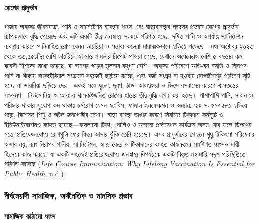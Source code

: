 \paragraph{রোগের
প্রাদুর্ভাব}\label{ux9b0ux997ux9b0-ux9aaux9b0ux9a6ux9b0ux9adux9ac}

গাজায় অবরুদ্ধ জীবনযাত্রা, পানি ও স্যানিটেশন ব্যবস্থার ধ্বংস এবং স্বাস্থ্যব্যবস্থার
পতনের প্রভাবে রোগের প্রাদুর্ভাব ব্যাপকভাবে বৃদ্ধি পেয়েছে এবং এটি একটি তীব্র
জনস্বাস্থ্য সংকটে পরিণত হচ্ছে; দূষিত পানি ও অপর্যাপ্ত স্যানিটেশন ব্যবস্থার কারণে
পানিবাহিত রোগ যেমন ডায়রিয়া ও সম্ভাব্য কলেরা মারাত্মকভাবে ছড়িয়ে পড়েছে---মধ্য
অক্টোবর ২০২৩ থেকে ৩৩,৫৫১টির বেশি ডায়রিয়া আক্রান্ত মামলার রিপোর্ট পাওয়া গেছে,
যেখানে অর্ধেকেরও বেশি ৫ বছরের কম বয়েসী শিশুদের মধ্যে হয়েছে, যা আগের গড়ের
তুলনায় বহুগুণ বেশি। অবরুদ্ধ পরিবেশে অতি-ঘন বসতি ও নিরাপদ পানি না থাকায়
ব্যাকটেরিয়াল সংক্রমণ সহজেই ছড়িয়ে যাচ্ছে, এবং বর্জ্য সংগ্রহ না হওয়ায় রোগজীবাণুর
পরিবেশ সৃষ্টি হচ্ছে যা ডায়রিয়া ছড়িয়ে দেয়। একই সঙ্গে ধুলো, দূষণ, ঠান্ডা আবহাওয়া
ও ভিড়ে বসবাসের কারণে শ্বাসতন্ত্রের সংক্রমণ---নিউমোনিয়া ও অন্যান্য শ্বাসকষ্টজনিত
রোগের হারের তীব্র বৃদ্ধি লক্ষ্য করা হচ্ছে। পাশাপাশি পানি, সাবান ও পরিষ্কার
থাকার সুযোগ কম থাকায় চর্মরোগ যেমন স্ক্যাবিস, ফাঙ্গাল ইনফেকশন ও অন্যান্য ত্বক
সংক্রমণ দ্রুত ছড়িয়ে পড়ে, বিশেষত শিশু ও অটল জনগোষ্ঠীর মধ্যে। স্বাস্থ্য ব্যবস্থা
ভাঙার কারণে নিয়মিত টিকাদান কর্মসূচি ও ইমিউনাইজেশনও ব্যাহত হয়েছে---ফসলানো
টিকা, পোলিও ও অন্যান্য প্রতিষেধক কার্যক্রম অসম, যার ফলে ডিপথের মতো
প্রতিষেধনযোগ্য রোগগুলি ফের ফিরে আসার ঝুঁকি তৈরি হয়েছে। এসব প্রাদুর্ভাবের পেছনে
শুধু চিকিৎসা পরিষেবার অভাব নয়, বরং নিরাপদ পানীয়, স্যানিটেশন, স্বাস্থ্য কেন্দ্র ও
টিকাদানের ব্যাহত কার্যক্রমের সমষ্টিগত ধ্বংসও দায়ী হিসেবে কাজ করছে, যা একটি
সহজেই প্রতিরোধযোগ্য জনস্বাস্থ্য বিপর্যয়কে একটি বিস্তৃত মহামারি-সদৃশ পরিস্থিতিতে
পরিণত করেছে (\emph{Life Course Immunization: Why Lifelong Vaccination Is
Essential for Public Health}, n.d.)।

\subsubsection{দীর্ঘমেয়াদী সামাজিক, অর্থনৈতিক ও মানসিক
প্রভাব}\label{ux9a6ux9b0ux998ux9aeux9dfux9a6-ux9b8ux9aeux99cux995-ux985ux9b0ux9a5ux9a8ux9a4ux995-ux993-ux9aeux9a8ux9b8ux995-ux9aaux9b0ux9adux9ac}

\paragraph{সামাজিক কাঠামো
ধ্বংস}\label{ux9b8ux9aeux99cux995-ux995ux9a0ux9ae-ux9a7ux9acux9b8}

